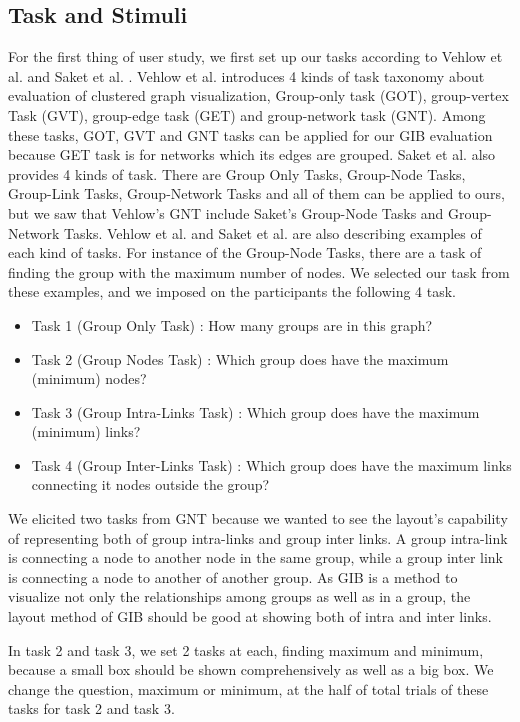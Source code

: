\documentclass{llncs}
\begin{document}
\subsection{Task and Stimuli}
For the first thing of user study, we first set up our tasks according to Vehlow et al. \cite{survey} and Saket et al. \cite{saket}.
Vehlow et al. introduces 4 kinds of task taxonomy about evaluation of clustered graph visualization, Group-only task (GOT), group-vertex Task (GVT), group-edge task (GET) and group-network task (GNT).
Among these tasks, GOT, GVT and GNT tasks can be applied for our GIB evaluation because GET task is for networks which its edges are grouped.
Saket et al. also provides 4 kinds of task.
There are Group Only Tasks, Group-Node Tasks, Group-Link Tasks, Group-Network Tasks and all of them can be applied to ours, but we saw that Vehlow's GNT include Saket's Group-Node Tasks and Group-Network Tasks.
Vehlow et al. and Saket et al. are also describing examples of each kind of tasks.
For instance of the Group-Node Tasks, there are a task of finding the group with the maximum number of nodes.
We selected our task from these examples, and we imposed on the participants the following 4 task.

\begin{itemize}
\item Task 1 (Group Only Task) : How many groups are in this graph?
\item Task 2 (Group Nodes Task) : Which group does have the maximum (minimum) nodes?
\item Task 3 (Group Intra-Links Task) : Which group does have the maximum (minimum) links?
\item Task 4 (Group Inter-Links Task) : Which group does have the maximum links connecting it nodes outside the group?
\end{itemize}

We elicited two tasks from GNT because we wanted to see the layout's capability of representing both of group intra-links and group inter links.
A group intra-link is connecting a node to another node in the same group, while a group inter link is connecting a node to another of another group.
As GIB is a method to visualize not only the relationships among groups as well as in a group, the layout method of GIB should be good at showing both of intra and inter links.


In task 2 and task 3, we set 2 tasks at each, finding maximum and minimum, because a small box should be shown comprehensively as well as a big box.
We change the question, maximum or minimum, at the half of total trials of these tasks for task 2 and task 3.
\end{document}
